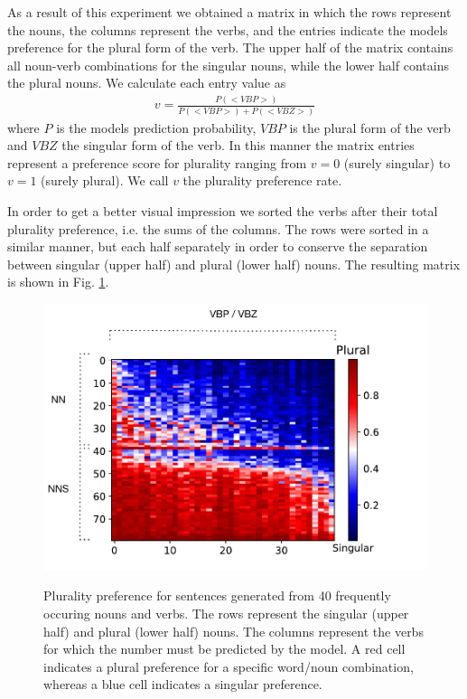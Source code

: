 As a result of this experiment we obtained a matrix in which 
the rows represent the nouns,
the columns represent the verbs, and
the entries indicate the models preference for the plural form of the verb. 
The upper half of the matrix contains all noun-verb combinations for the singular nouns, while the lower half contains the plural nouns. 
We calculate each entry value as
\begin{align*}
	v = \frac{P(<VBP>)}{P(<VBP>) + P(<VBZ>)} 
\end{align*}
where $P$ is the models prediction probability, $VBP$ is the plural 
form of the verb and $VBZ$ the singular form of the verb. 
In this manner the matrix entries represent 
a preference score for plurality ranging from
$v=0$ (surely singular) to $v=1$ (surely plural). 
We call $v$ the plurality preference rate. 

In order to get a better visual impression we sorted the verbs 
after their total plurality preference, i.e. the sums of the columns. 
The rows were sorted in a similar manner, but each half separately in order to conserve the separation between singular (upper half) and plural (lower half) nouns. The resulting matrix is shown in Fig. \ref{fig:matrix_ratio}.

    \begin{figure}[t]
    \centering
        \includegraphics[scale=0.5]{matrix_plot_ratio.pdf}
        \label{fig:matrix_ratio}
        \caption{Plurality preference for sentences generated from 40 frequently
        occuring nouns and verbs. The rows represent the 
        singular (upper half) and plural (lower half) nouns.
        The columns represent the verbs for which the number must
        be predicted by the model. 
        A red cell indicates a plural preference for a specific word/noun 
        combination, whereas a blue 
        cell indicates a singular preference. }
    \end{figure}

